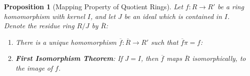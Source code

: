 \documentclass[12pt]{article}
\newtheorem{prop}[thm]{Proposition}
\theoremstyle{definition}
\theoremstyle{remark}
\numberwithin{equation}{section}
\newcommand\B[1]{\textbf{ #1}}
\begin{document}
\begin{prop}[Mapping Property of Quotient Rings]
        Let $f:R\rightarrow R'$ be a ring homomorphism with kernel $I$, and let $J$ be an ideal which is contained in $I$. Denote the residue ring $R/J$ by $\overline{R}$:\begin{enumerate}
                \item There is a unique homomorphism $\overline{f}:\overline{R}\rightarrow R'$ such that $\overline{f}\pi = f$:
                        \begin{figure}[H]
                                \centering
                        \end{figure}
                \item \B{First Isomorphism Theorem}: If $J = I$, then $\overline{f}$ maps $\overline{R}$ isomorphically, to the image of $f$. 
        \end{enumerate}
\end{prop}

\vspace{15pt}
\end{document}
